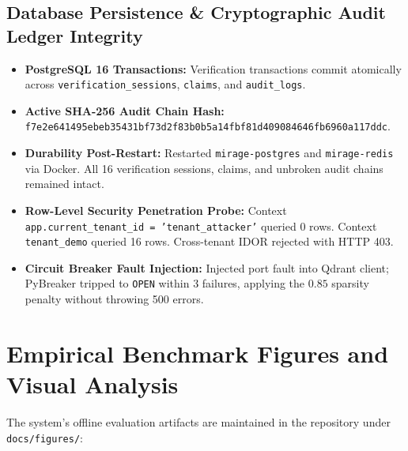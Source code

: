 \documentclass[11pt,a4paper]{article}
\begin{document}
\subsection{Database Persistence \& Cryptographic Audit Ledger Integrity}
\begin{itemize}[leftmargin=*]
    \item \textbf{PostgreSQL 16 Transactions:} Verification transactions commit atomically across \texttt{verification\_sessions}, \texttt{claims}, and \texttt{audit\_logs}.
    \item \textbf{Active SHA-256 Audit Chain Hash:} \texttt{f7e2e641495ebeb35431bf73d2f83b0b5a14fbf81d409084646fb6960a117ddc}.
    \item \textbf{Durability Post-Restart:} Restarted \texttt{mirage-postgres} and \texttt{mirage-redis} via Docker. All 16 verification sessions, claims, and unbroken audit chains remained intact.
    \item \textbf{Row-Level Security Penetration Probe:} Context \texttt{app.current\_tenant\_id = 'tenant\_attacker'} queried 0 rows. Context \texttt{tenant\_demo} queried 16 rows. Cross-tenant IDOR rejected with HTTP 403.
    \item \textbf{Circuit Breaker Fault Injection:} Injected port fault into Qdrant client; PyBreaker tripped to \texttt{OPEN} within 3 failures, applying the $0.85$ sparsity penalty without throwing 500 errors.
\end{itemize}

\section{Empirical Benchmark Figures and Visual Analysis}

The system's offline evaluation artifacts are maintained in the repository under \texttt{docs/figures/}:
\end{document}
